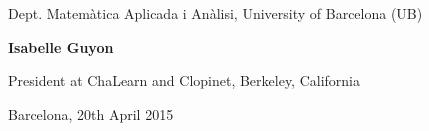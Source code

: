 {Dept. Matemàtica Aplicada i Anàlisi, University of Barcelona (UB)}


\medskip %

{\Large\bf Isabelle Guyon}

\medskip %

{President at ChaLearn and Clopinet, Berkeley, California}



\medskip\medskip\medskip\medskip\medskip

\begin{center}
{\Large Barcelona, 20th April 2015}
\end{center}


